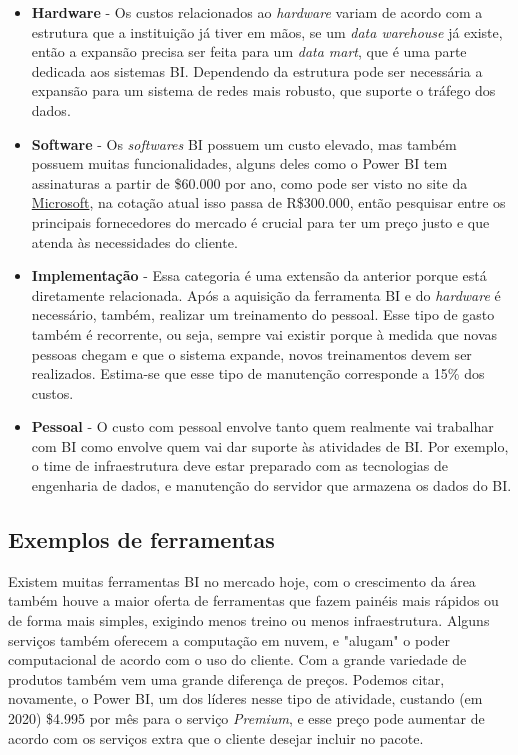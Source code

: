 \begin{itemize}
	\item \textbf{Hardware} - Os custos relacionados ao \textit{hardware} variam de acordo com a estrutura que a instituição já tiver em mãos, se um \textit{data warehouse} já existe, então a expansão precisa ser feita para um \textit{data mart}, que é uma parte dedicada aos sistemas BI. Dependendo da estrutura pode ser necessária a expansão para um sistema de redes mais robusto, que suporte o tráfego dos dados.
	
	\item \textbf{Software} - Os \textit{softwares} BI possuem um custo elevado, mas também possuem muitas funcionalidades, alguns deles como o Power BI tem assinaturas a partir de \$60.000 por ano, como pode ser visto no site da \href{https://powerbi.microsoft.com/en-us/pricing/}{Microsoft}, na cotação atual isso passa de R\$300.000, então pesquisar entre os principais fornecedores do mercado é crucial para ter um preço justo e que atenda às necessidades do cliente.
	
	\item \textbf{Implementação} - Essa categoria é uma extensão da anterior porque está diretamente relacionada. Após a aquisição da ferramenta BI e do \textit{hardware} é necessário, também, realizar um treinamento do pessoal. Esse tipo de gasto também é recorrente, ou seja, sempre vai existir porque à medida que novas pessoas chegam e que o sistema expande, novos treinamentos devem ser realizados. Estima-se que esse tipo de manutenção corresponde a 15\% dos custos.
	
	\item \textbf{Pessoal} - O custo com pessoal envolve tanto quem realmente vai trabalhar com BI como envolve quem vai dar suporte às atividades de BI. Por exemplo, o time de infraestrutura deve estar preparado com as tecnologias de engenharia de dados, e manutenção do servidor que armazena os dados do BI.
	
\end{itemize}

\subsection{Exemplos de ferramentas}

Existem muitas ferramentas BI no mercado hoje, com o crescimento da área também houve a maior oferta de ferramentas que fazem painéis mais rápidos ou de forma mais simples, exigindo menos treino ou menos infraestrutura. Alguns serviços também oferecem a computação em nuvem, e "alugam" o poder computacional de acordo com o uso do cliente. Com a grande variedade de produtos também vem uma grande diferença de preços. Podemos citar, novamente, o Power BI, um dos líderes nesse tipo de atividade, custando (em 2020) \$4.995 por mês para o serviço \textit{Premium}, e esse preço pode aumentar de acordo com os serviços extra que o cliente desejar incluir no pacote.

